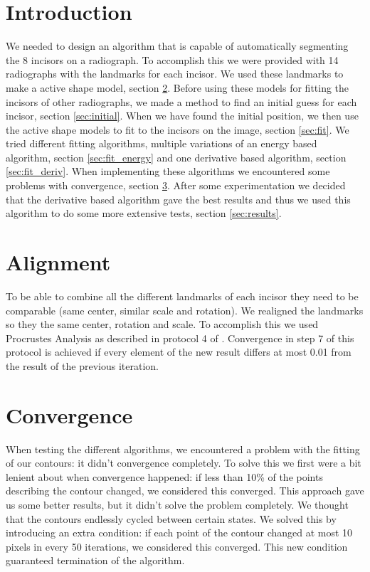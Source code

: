 \documentclass[a4paper,10pt]{article}
\begin{document}


\tableofcontents
\newpage

\section{Introduction}\label{sec:introduction}
We needed to design an algorithm that is capable of automatically segmenting the 8 incisors on a radiograph.
To accomplish this we were provided with 14 radiographs with the landmarks for each incisor. We used these landmarks to make a active shape model, section \ref{sec:alignment}. Before using these models for fitting the incisors of other radiographs, we made a method to find an initial guess for each incisor, section \ref{sec:initial}. When we have found the initial position, we then use the active shape models to fit to the incisors on the image, section \ref{sec:fit}. We tried different fitting algorithms, multiple variations of an energy based algorithm, section \ref{sec:fit_energy} and one derivative based algorithm, section \ref{sec:fit_deriv}. When implementing these algorithms we encountered some problems with convergence, section \ref{sec:convergence}. After some experimentation we decided that the derivative based algorithm gave the best results and thus we used this algorithm to do some more extensive tests, section \ref{sec:results}.


\section{Alignment} \label{sec:alignment}
To be able to combine all the different landmarks of each incisor they need to be comparable (same center, similar scale and rotation). We realigned the landmarks so they the same center, rotation and scale. To accomplish this we used Procrustes Analysis as described in protocol 4 of \cite{TemplateAlgorithm}. Convergence in step 7 of this protocol is achieved if every element of the new result differs at most 0.01 from the result of the previous iteration.

\section{Convergence}\label{sec:convergence}
When testing the different algorithms, we encountered a problem with the fitting of our contours: it didn't convergence completely. To solve this we first were a bit lenient about when convergence happened: if less than 10\% of the points describing the contour changed, we considered this converged. This approach gave us some better results, but it didn't solve the problem completely. We thought that the contours endlessly cycled between certain states. We solved this by introducing an extra condition: if each point of the contour changed at most 10 pixels in every 50 iterations, we considered this converged. This new condition guaranteed termination of the algorithm. 
\end{document}

